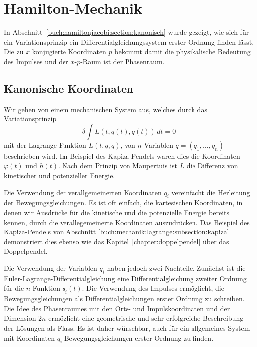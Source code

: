 %
%
%
\section{Hamilton-Mechanik
\label{buch:mechanik:section:hamilton}}
In Abschnitt~\ref{buch:hamiltonjacobi:section:kanonisch} wurde gezeigt,
wie sich für ein Variationsprinzip ein Differentialgleichungssystem
erster Ordnung finden lässt.
Die zu $x$ konjugierte Koordinaten $p$ bekommt damit die physikalische
Bedeutung des Impulses und der $x$-$p$-Raum ist der Phasenraum.

%
%
\subsection{Kanonische Koordinaten}
Wir gehen von einem mechanischen System aus, welches durch das
Variationsprinzip 
\begin{equation}
\delta
\int
L(t, q(t), \dot{q}(t))\,dt
=
0
\label{buch:mechanik:hamilton:eqn:variation}
\end{equation}
mit der Lagrange-Funktion $L(t,q,\dot{q})$, von $n$ Variablen
$q=(q_1,\dots,q_n)$ beschrieben wird.
Im Beispiel des Kapiza-Pendels waren dies die Koordinaten $\varphi(t)$
und $h(t)$.
Nach dem Prinzip von Maupertuis ist $L$ die Differenz von kinetischer
und potenzieller Energie.

Die Verwendung der verallgemeinerten Koordinaten $q_i$ vereinfacht
die Herleitung der Bewegungsgleichungen.
Es ist oft einfach, die kartesischen Koordinaten, in denen wir Ausdrücke
für die kinetische und die potenzielle Energie bereits kennen, durch
die verallegemeinerte Koordinaten auszudrücken.
Das Beispiel des Kapiza-Pendels von
Abschnitt \ref{buch:mechanik:lagrange:subsection:kapiza}
demonstriert dies ebenso wie das Kapitel~\ref{chapter:doppelpendel}
über das Doppelpendel.

Die Verwendung der Variablen $q_i$ haben jedoch zwei Nachteile.
Zunächst ist die Euler-Lagrange-Differentialgleichung eine
Differentialgleichung zweiter Ordnung für die $n$ Funktion 
$q_i(t)$.
Die Verwendung des Impulses ermöglicht, die Bewegungsgleichungen
als Differentialgleichungen erster Ordnung zu schreiben.
Die Idee des Phasenraumes mit den Orts- und Impulskoordinaten
und der Dimension $2n$ ermöglicht eine geometrische und sehr erfolgreiche
Beschreibung der Lösungen als Fluss.
Es ist daher wünschbar, auch für ein allgemeines System mit Koordinaten
$q_i$ Bewegungsgleichungen erster Ordnung zu finden.

